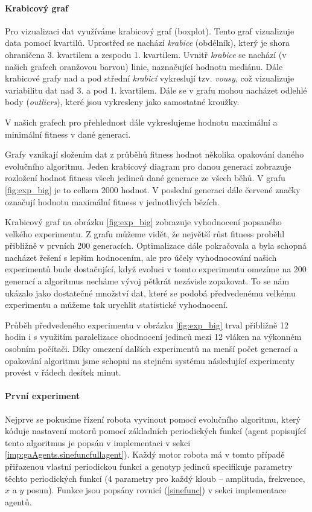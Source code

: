 \paragraph{Krabicový graf}
Pro vizualizaci dat využíváme krabicový graf (boxplot). Tento graf vizualizuje
data pomocí kvartilů. Uprostřed se nachází \emph{krabice} (obdélník), který je
shora ohraničena 3. kvartilem a zespodu 1. kvartilem. Uvnitř \emph{krabice} se
nachází (v našich grafech oranžovou barvou) linie, naznačující hodnotu mediánu.
Dále krabicové grafy nad a pod střední \emph{krabicí} vykreslují tzv.
\emph{vousy}, což vizualizuje variabilitu dat nad 3. a pod 1. kvartilem. Dále
se v grafu mohou nacházet odlehlé body (\emph{outliers}), které jsou vykresleny
jako samostatné kroužky.

V našich grafech pro přehlednost dále vykreslujeme hodnotu maximální a
minimální fitness v dané generaci.

Grafy vznikají složením dat z průběhů fitness hodnot několika opakování daného
evolučního algoritmu. Jeden krabicový diagram pro danou generaci zobrazuje
rozložení hodnot fitness všech jedinců dané generace ze všech běhů. V grafu
\ref{fig:exp_big} je to celkem 2000 hodnot. V poslední generaci dále červené
značky označují hodnotu maximální fitness v jednotlivých bězích. 

Krabicový graf na obrázku \ref{fig:exp_big} zobrazuje vyhodnocení popsaného
velkého experimentu. Z grafu můžeme vidět, že největší růst fitness proběhl
přibližně v prvních 200 generacích. Optimalizace dále pokračovala a byla
schopná nacházet řešení s lepším hodnocením, ale pro účely vyhodnocování našich 
experimentů bude dostačující, když evoluci v tomto experimentu omezíme na 200
generací a algoritmus necháme vývoj pětkrát nezávisle zopakovat. To se nám
ukázalo jako dostatečné množství dat, které se podobá předvedenému velkému
experimentu a můžeme tak urychlit statistické vyhodnocení. 

Průběh předvedeného experimentu v obrázku \ref{fig:exp_big} trval přibližně 12
hodin i s využitím paralelizace ohodnocení jedinců mezi 12 vláken na výkonném
osobním počítači. Díky omezení dalších experimentů na menší počet generací a
opakování algoritmu jsme schopni na stejném systému následující experimenty
provést v řádech desítek minut.

\paragraph{První experiment}
Nejprve se pokusíme řízení robota vyvinout pomocí evolučního
algoritmu, který kóduje nastavení motorů pomocí základních periodických funkcí
(agent popisující tento algoritmus je popsán v implementaci v sekci
\ref{imp:gaAgents.sinefuncfullagent}). Každý motor robota má v tomto případě
přiřazenou vlastní periodickou funkci a genotyp jedinců specifikuje parametry
těchto periodických funkcí (4 parametry pro každý kloub -- amplituda,
frekvence, $x$ a $y$ posun). Funkce jsou popsány rovnicí (\ref{sinefunc}) v
sekci implementace agentů.


